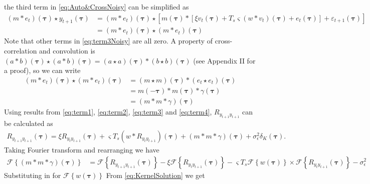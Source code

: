\documentclass[]{article}
\begin{document}
the third term in \eqref{eq:Auto&CrossNoisy} can be simplified as
\begin{align}\label{eq:term3Noisy}
(m\ast e_t)(\boldsymbol\tau)\star y_{t+1}(\boldsymbol\tau)&= \left(m \ast e_t\right)(\boldsymbol\tau) \star\left[m\left(\boldsymbol\tau\right) \ast \left[\xi v_t\left(\boldsymbol\tau\right) + 
	T_s \varsigma \left(w \ast v_t\right)(\boldsymbol \tau)
	+ e_t\left(\boldsymbol{\tau}\right) \right]+\varepsilon_{t+1}(\boldsymbol\tau) \right]\nonumber \\
	&=\left(m \ast e_t\right)(\boldsymbol\tau)\star\left(m \ast e_t\right)(\boldsymbol\tau)
\end{align}
Note that other terms in \ref{eq:term3Noisy} are all zero. A property of cross-correlation and convolution is $(a \ast b)(\boldsymbol\tau) \star (a \ast b)(\boldsymbol\tau)=(a \star a)(\boldsymbol\tau)\ast(b \star b)(\boldsymbol\tau)$ (see Appendix II for a proof), so we can write
\begin{align}\label{eq:term4}
\left(m \ast e_t\right)(\boldsymbol\tau)\star\left(m \ast e_t\right)(\boldsymbol\tau)&=\left(m \star m\right)(\boldsymbol\tau)\ast\left(e_t \star e_t\right)(\boldsymbol\tau) \nonumber\\
&=m(-\boldsymbol\tau)\ast m(\boldsymbol\tau)\ast \gamma(\boldsymbol\tau) \nonumber \\
&=(m\ast m \ast \gamma)(\boldsymbol\tau)
\end{align}
Using results from \ref{eq:term1}, \ref{eq:term2}, \ref{eq:term3} and \ref{eq:term4}, $R_{y_{t+1}y_{t+1}}$ can be calculated as
\begin{align}
	R_{y_{t+1}y_{t+1}}(\boldsymbol{\tau})= \xi R_{y_ty_{t+1}}(\boldsymbol{\tau})+\varsigma T_s \left(w \ast R_{y_ty_{t+1}} \right)(\boldsymbol{\tau})+(m\ast m \ast \gamma)(\boldsymbol\tau)+\sigma_{\epsilon}^2\delta_K(\boldsymbol{\tau}).
\end{align}
Taking Fourier transform and rearranging we have
\begin{align}
 \mathcal F\left\lbrace (m\ast m \ast \gamma)(\boldsymbol\tau)\right\rbrace&= \mathcal F\left\lbrace R_{y_{t+1}y_{t+1}}(\boldsymbol{\tau})\right\rbrace-\xi\mathcal F\left\lbrace R_{y_{t}y_{t+1}}(\boldsymbol{\tau})\right\rbrace-\varsigma T_s \mathcal F\left\lbrace w(\boldsymbol{\tau})\right\rbrace \times \mathcal F \left\lbrace R_{y_ty_{t+1}}(\boldsymbol{\tau})\right\rbrace-\sigma_{\epsilon}^2 
\end{align}
Substituting in for $\mathcal{F}\left\lbrace w(\boldsymbol{\tau})\right\rbrace$ From \ref{eq:KernelSolution} we get
\end{document}
